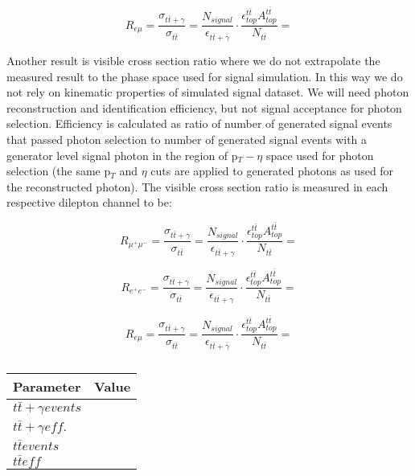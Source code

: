 \begin{equation}
	R_{e\mu} = \frac{\sigma_{t\bar{t}+\gamma}}{\sigma_{t\bar{t}}} = \frac{N_{signal}}{\epsilon_{t\bar{t}+\gamma}} \cdot \frac{\epsilon^{t\bar{t}}_{top} A^{t\bar{t}}_{top}}{N_{t\bar{t}}} =  
\end{equation}

Another result is visible cross section ratio where we do not extrapolate the measured result to the phase space used for signal simulation. In this way we do not rely on kinematic properties of simulated signal dataset. We will need photon reconstruction and identification efficiency, but not signal acceptance for photon selection. Efficiency is calculated as ratio of number of generated signal events that passed photon selection to number of generated signal events with a generator level signal photon in the region of p$_T - \eta$ space used for photon selection (the same p$_T$ and $\eta$ cuts are applied to generated photons as used for the reconstructed photon). The visible cross section ratio is measured in each respective dilepton channel to be:

\begin{equation}
	R_{\mu^+\mu^-} = \frac{\sigma_{t\bar{t}+\gamma}}{\sigma_{t\bar{t}}} = \frac{N_{signal}}{\epsilon_{t\bar{t}+\gamma}} \cdot \frac{\epsilon^{t\bar{t}}_{top} A^{t\bar{t}}_{top}}{N_{t\bar{t}}} = 
\end{equation}

\begin{equation}
	R_{e^+e^-} = \frac{\sigma_{t\bar{t}+\gamma}}{\sigma_{t\bar{t}}} = \frac{N_{signal}}{\epsilon_{t\bar{t}+\gamma}} \cdot \frac{\epsilon^{t\bar{t}}_{top} A^{t\bar{t}}_{top}}{N_{t\bar{t}}} = 
\end{equation}

\begin{equation}
	R_{e\mu} = \frac{\sigma_{t\bar{t}+\gamma}}{\sigma_{t\bar{t}}} = \frac{N_{signal}}{\epsilon_{t\bar{t}+\gamma}} \cdot \frac{\epsilon^{t\bar{t}}_{top} A^{t\bar{t}}_{top}}{N_{t\bar{t}}} = 
\end{equation}

\begin{table}
\centering
\begin{tabular}{|l|l|}
\hline
	\textbf{Parameter} & \textbf{Value} \\
\hline
	$t\bar{t}+\gamma events$ & \\
	$t\bar{t}+\gamma eff.$ & \\
	$t\bar{t} events$ & \\
	$t\bar{t} eff$ & \\
\hline
\end{tabular}
\caption{}
\end{table}	

